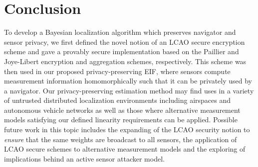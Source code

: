 \documentclass[10pt,letterpaper,oneside,twocolumn,journal]{IEEEtran}
\theoremstyle{definition}
\theoremstyle{definition}
\theoremstyle{remark}
\begin{document}
\section{Conclusion} \label{sec:conclusion}
To develop a Bayesian localization algorithm which preserves navigator and sensor privacy, we first defined the novel notion of an LCAO secure encryption scheme and gave a provably secure implementation based on the Paillier and Joye-Libert encryption and aggregation schemes, respectively. This scheme was then used in our proposed privacy-preserving EIF, where sensors compute measurement information homomorphically such that it can be privately used by a navigator. Our privacy-preserving estimation method may find uses in a variety of untrusted distributed localization environments including airspaces and autonomous vehicle networks as well as those where alternative measurement models satisfying our defined linearity requirements can be applied. Possible future work in this topic includes the expanding of the LCAO security notion to \textit{ensure} that the same weights are broadcast to all sensors, the application of LCAO secure schemes to alternative measurement models and the exploring of implications behind an active sensor attacker model.

% 
%                                                                                         
%                                                                                         
%                                                                                         
% 

\appendices
\end{document}
